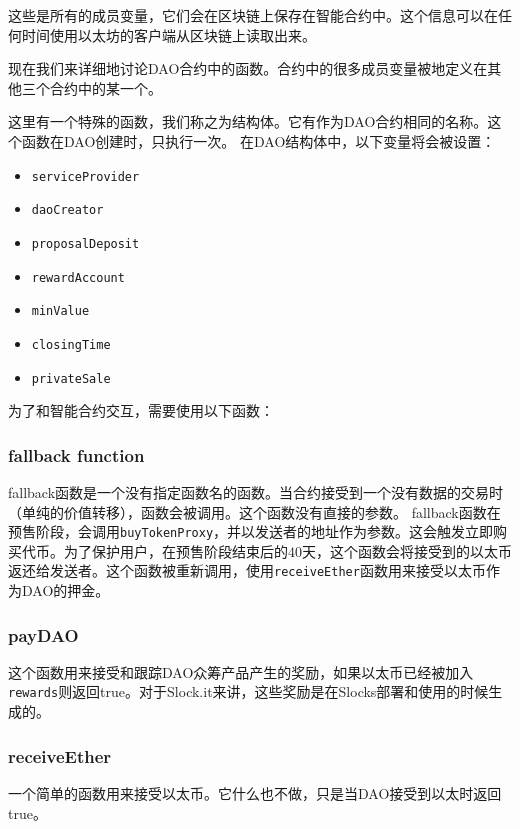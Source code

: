 \documentclass[9pt,oneside]{amsart}
\begin{document}
\begin{multicols}{2}
这些是所有的成员变量，它们会在区块链上保存在智能合约中。这个信息可以在任何时间使用以太坊的客户端从区块链上读取出来。

现在我们来详细地讨论DAO合约中的函数。合约中的很多成员变量被地定义在其他三个合约中的某一个。

这里有一个特殊的函数，我们称之为结构体。它有作为DAO合约相同的名称。这个函数在DAO创建时，只执行一次。
在DAO结构体中，以下变量将会被设置：
\begin{itemize}
 \item \verb|serviceProvider|
 \item \verb|daoCreator|
 \item \verb|proposalDeposit|
 \item \verb|rewardAccount| 
 \item \verb|minValue|
 \item \verb|closingTime|
 \item \verb|privateSale|
\end{itemize}

为了和智能合约交互，需要使用以下函数：

\subsubsection*{fallback function}
fallback函数是一个没有指定函数名的函数。当合约接受到一个没有数据的交易时（单纯的价值转移），函数会被调用。这个函数没有直接的参数。
fallback函数在预售阶段，会调用\verb|buyTokenProxy|，并以发送者的地址作为参数。这会触发立即购买代币。为了保护用户，在预售阶段结束后的$40$天，这个函数会将接受到的以太币返还给发送者。这个函数被重新调用，使用\verb|receiveEther|函数用来接受以太币作为DAO的押金。

\subsubsection*{payDAO}
这个函数用来接受和跟踪DAO众筹产品产生的奖励，如果以太币已经被加入\verb|rewards|则返回true。对于Slock.it来讲，这些奖励是在Slocks部署和使用的时候生成的。

\subsubsection*{receiveEther}
一个简单的函数用来接受以太币。它什么也不做，只是当DAO接受到以太时返回true。


\end{multicols}
\end{document}
